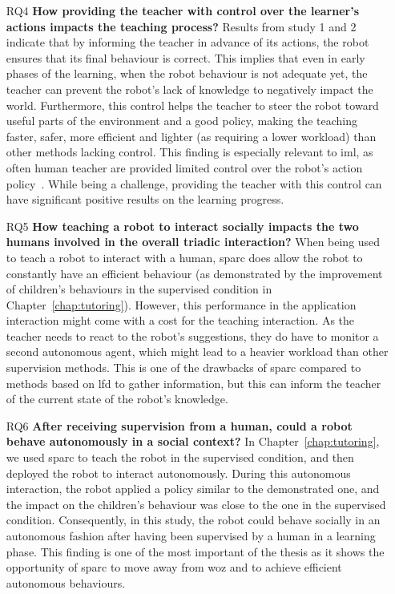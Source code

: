 \begin{itemize}
\item [RQ4] \textbf{How providing the teacher with control over the learner's actions impacts the teaching process?} 
Results from study 1 and 2 indicate that by informing the teacher in advance of its actions, the robot ensures that its final behaviour is correct. This implies that even in early phases of the learning, when the robot behaviour is not adequate yet, the teacher can prevent the robot's lack of knowledge to negatively impact the world. Furthermore, this control helps the teacher to steer the robot toward useful parts of the environment and a good policy, making the teaching faster, safer, more efficient and lighter (as requiring a lower workload) than other methods lacking control. This finding is especially relevant to \gls{iml}, as often human teacher are provided limited control over the robot's action policy~\citep{thomaz2008teachable,knox2009interactively}. While being a challenge, providing the teacher with this control can have significant positive results on the learning progress.

\item [RQ5] \textbf{How teaching a robot to interact socially impacts the two humans involved in the overall triadic interaction?}
When being used to teach a robot to interact with a human, \gls{sparc} does allow the robot to constantly have an efficient behaviour (as demonstrated by the improvement of children's behaviours in the supervised condition in Chapter~\ref{chap:tutoring}). However, this performance in the application interaction might come with a cost for the teaching interaction. As the teacher needs to react to the robot's suggestions, they do have to monitor a second autonomous agent, which might lead to a heavier workload than other supervision methods. This is one of the drawbacks of \gls{sparc} compared to methods based on \gls{lfd} to gather information, but this can inform the teacher of the current state of the robot's knowledge.

\item [RQ6] \textbf{After receiving supervision from a human, could a robot behave autonomously in a social context?}
In Chapter~\ref{chap:tutoring}, we used \gls{sparc} to teach the robot in the supervised condition, and then deployed the robot to interact autonomously. During this autonomous interaction, the robot applied a policy similar to the demonstrated one, and the impact on the children's behaviour was close to the one in the supervised condition. Consequently, in this study, the robot could behave socially in an autonomous fashion after having been supervised by a human in a learning phase. This finding is one of the most important of the thesis as it shows the opportunity of \gls{sparc} to move away from \gls{woz} and to achieve efficient autonomous behaviours.

\end{itemize}
